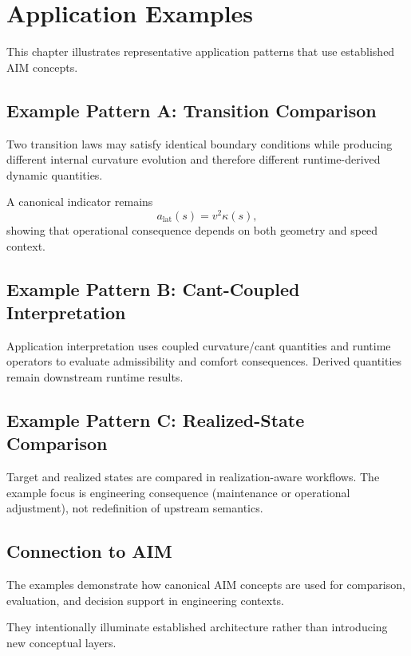 
\chapter{Application Examples}

\label{chap:applications-examples}

This chapter illustrates representative application patterns that use
established AIM concepts.

\section{Example Pattern A: Transition Comparison}

Two transition laws may satisfy identical boundary conditions while
producing different internal curvature evolution and therefore different
runtime-derived dynamic quantities.

A canonical indicator remains
\[
a_{\mathrm{lat}}(s)=v^2\kappa(s),
\]
showing that operational consequence depends on both geometry and speed
context.

\section{Example Pattern B: Cant-Coupled Interpretation}

Application interpretation uses coupled curvature/cant quantities and
runtime operators to evaluate admissibility and comfort consequences.
Derived quantities remain downstream runtime results.

\section{Example Pattern C: Realized-State Comparison}

Target and realized states are compared in realization-aware workflows.
The example focus is engineering consequence (maintenance or operational
adjustment), not redefinition of upstream semantics.

\section{Connection to AIM}

\begin{summary}
The examples demonstrate how canonical AIM concepts are used for
comparison, evaluation, and decision support in engineering contexts.

They intentionally illuminate established architecture rather than
introducing new conceptual layers.
\end{summary}
